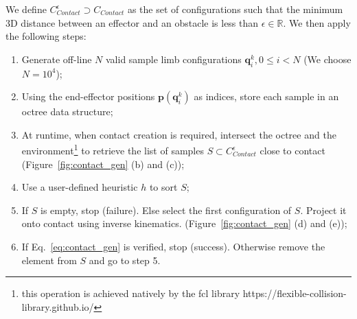 \documentclass[journal]{IEEEtran}
\providecommand{\DIFaddtex}[1]{#1} %
\providecommand{\DIFaddbegin}{\protect\color{blue}} %
\providecommand{\DIFaddend}{\protect\color{black}} %
\providecommand{\DIFadd}[1]{\texorpdfstring{\DIFaddtex{#1}}{#1}} %
\begin{document}



We define $C_{Contact}^{\epsilon} \supset C_{Contact}$ as the set of configurations such that the minimum \DIFaddbegin \DIFadd{3D }\DIFaddend distance 
between an effector and an obstacle is less than $\epsilon \in \mathbb{R}$.
We then apply the following steps:
\begin{enumerate}
\item Generate off-line $N$ valid sample limb configurations $\mathbf{q}^k_i,  0 \leq i < N$ (We choose $N=10^4$);
\item Using the end-effector positions $\mathbf{p}(\mathbf{q}^k_i)$ as indices, store each sample in an octree data structure;
\item At runtime, when contact creation is required, intersect the octree and the environment\DIFaddbegin \footnote{\DIFadd{this operation is achieved natively by the fcl library https://flexible-collision-library.github.io/}} \DIFaddend to retrieve the list of samples $S \subset C_{Contact}^{\epsilon}$ close to contact (Figure~\ref{fig:contact_gen} (b) and (c));
\item Use a user-defined heuristic $h$ to sort $S$;
\item If $S$ is empty, stop (failure). Else select the first configuration of $S$. Project it onto contact using inverse kinematics. (Figure~\ref{fig:contact_gen} (d) and (e));
\item If Eq.~\ref{eq:contact_gen} is verified, stop (success). Otherwise remove the element from $S$ and go to step 5.
\end{enumerate}
\end{document}
